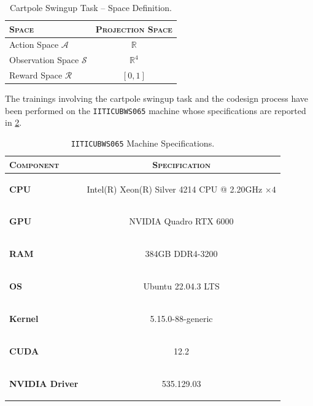\begin{table}
    \centering
    \label{tab:cartpoleswinguptaskspacedef}
    \begin{tabular}{l c}
        \toprule
        \textsc{Space}                  & \textsc{Projection Space} \\
        \midrule
        Action Space $\mathcal{A}$      & $\mathbb{R}$              \\
        Observation Space $\mathcal{S}$ & $\mathbb{R} ^{4}$         \\
        Reward Space $\mathcal{R}$      & $[0,1]$                   \\
        \bottomrule
    \end{tabular}
    \caption{Cartpole Swingup Task -- Space Definition.}
\end{table}

The trainings involving the cartpole swingup task and the codesign process have been performed on the \texttt{IITICUBWS065} machine whose specifications are reported in \cref{tab:rl_machine}.

\begin{table}[h]
    \centering
    \caption{\texttt{IITICUBWS065} Machine Specifications.}
    \label{tab:rl_machine}
    \begin{tabular}[h]{l c}
        \toprule
        \textsc{Component}     & \textsc{Specification}                                                        \\
        \midrule
        \textbf{CPU}           & \begin{small}Intel(R) Xeon(R) Silver 4214 CPU @ 2.20GHz $\times 4$\end{small} \\
        \textbf{GPU}           & \begin{small}NVIDIA Quadro RTX 6000             \end{small}                   \\
        \textbf{RAM}           & \begin{small}384GB DDR4-3200                         \end{small}              \\
        \textbf{OS}            & \begin{small}Ubuntu 22.04.3 LTS                       \end{small}             \\
        \textbf{Kernel}        & \begin{small}5.15.0-88-generic        \end{small}                             \\
        \textbf{CUDA}          & \begin{small}12.2                                  \end{small}                \\
        \textbf{NVIDIA Driver} & \begin{small}535.129.03                             \end{small}               \\
        \bottomrule
    \end{tabular}
\end{table}

